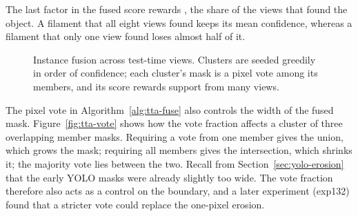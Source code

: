The last factor in the fused score rewards , the share of the views that found the
object. A filament that all eight views found keeps its mean confidence, whereas a filament that
only one view found loses almost half of it.

\begin{figure}[t]
\centering
{}
\caption{Instance fusion across test-time views. Clusters are seeded greedily in order of
confidence; each cluster's mask is a pixel vote among its members, and its score rewards support from
many views. }
\label{fig:tta-fusion}
\end{figure}

The pixel vote in Algorithm~\ref{alg:tta-fuse} also controls the width of the fused mask.
Figure~\ref{fig:tta-vote} shows how the vote fraction affects a cluster of three overlapping member
masks. Requiring a vote from one member gives the union, which
grows the mask; requiring all members gives the intersection, which shrinks it; the majority vote
lies between the two. Recall from Section~\ref{sec:yolo-erosion} that the early YOLO masks were
already slightly too wide. The vote fraction therefore also acts as a control on the boundary, and a
later experiment (exp132) found that a stricter vote could replace the one-pixel erosion.

